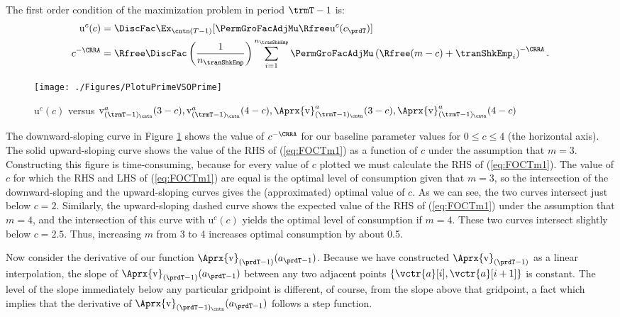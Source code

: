 \documentclass[titlepage, headings=optiontotocandhead]{econtex}
\begin{document}
The first order condition of the maximization problem in period $\trmT-1$ is:
  \begin{equation}\begin{gathered}\begin{aligned}
        \mathrm{u}^{c}(c)       & = \DiscFac \Ex_{\cntn(T-1)} [\PermGroFacAdjMu\Rfree \mathrm{u}^{c}(c_{\prdT})]  %
        \\      c^{-\CRRA}   & = \Rfree \DiscFac \left(\frac{1}{n_{\tranShkEmp}}\right) \sum_{i=1}^{n_{\tranShkEmp}} \PermGroFacAdjMu\left(\Rfree (m-c) + \tranShkEmp_{i}\right)^{-\CRRA} \label{eq:FOCTm1}.
      \end{aligned}\end{gathered}\end{equation}
\hypertarget{PlotuPrimeVSOPrime}{}
\begin{figure}
  \centerline{\texttt{[image: ./Figures/PlotuPrimeVSOPrime]}}
  \caption{$\mathrm{u}^{c}(c)$ versus $\mathrm{v}_{({\trmT-1})_\cntn}^{a}(3-c), \mathrm{v}_{({\trmT-1})_\cntn}^{a}(4-c), \Aprx{\mathrm{v}}_{({\trmT-1})_\cntn}^{a}(3-c), \Aprx{\mathrm{v}}_{({\trmT-1})_\cntn}^{a}(4-c)$}
  \label{fig:PlotuPrimeVSOPrime}
\end{figure}



The downward-sloping curve in Figure \ref{fig:PlotuPrimeVSOPrime}
shows the value of $c^{-\CRRA}$ for our baseline parameter values
for $0 \leq c \leq 4$ (the horizontal axis).  The solid
upward-sloping curve shows the value of the RHS of (\ref{eq:FOCTm1})
as a function of $c$ under the assumption that $m=3$.
Constructing this figure is time-consuming, because for every
value of $c$ plotted we must calculate the RHS of
(\ref{eq:FOCTm1}).  The value of $c$ for which the RHS and LHS
of (\ref{eq:FOCTm1}) are equal is the optimal level of consumption
given that $m=3$, so the intersection of the downward-sloping
and the upward-sloping curves gives the (approximated) optimal value of $c$.
As we can see, the two curves intersect just below $c=2$.
Similarly, the upward-sloping dashed curve shows the expected value
of the RHS of (\ref{eq:FOCTm1}) under the assumption that $m=4$,
and the intersection of this curve with $\mathrm{u}^{c}(c)$ yields the
optimal level of consumption if $m=4$.  These two curves
intersect slightly below $c=2.5$.  Thus, increasing $m$
from 3 to 4 increases optimal consumption by about 0.5.

Now consider the derivative of our function $\Aprx{\mathrm{v}}_{(\prdT-1)}(a_{\prdT-1})$.  Because we have
constructed $\Aprx{\mathrm{v}}_{(\prdT-1)}$ as a linear interpolation, the slope of
$\Aprx{\mathrm{v}}_{(\prdT-1)}(a_{\prdT-1})$ between any two adjacent points
$\{\vctr{a}[i],\vctr{a}[{i+1}]\}$ is constant.  The level of the slope immediately below any
particular gridpoint is different, of course, from the slope above that gridpoint, a fact which
implies that the derivative of $\Aprx{\mathrm{v}}_{(\prdT-1)_\cntn}(a_{\prdT-1})$ follows a step function.
\end{document}

